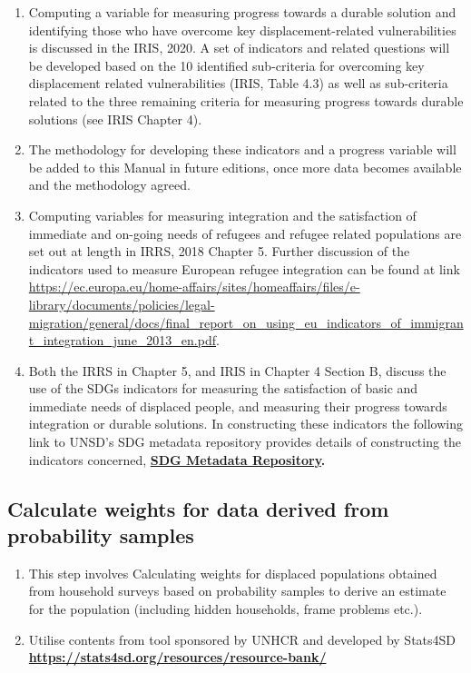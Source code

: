 \documentclass[
]{article}
\begin{document}
\begin{enumerate}
\def\labelenumi{\arabic{enumi}.}
\setcounter{enumi}{389}
\item
  Computing a variable for measuring progress towards a durable
  solution and identifying those who have overcome key
  displacement-related vulnerabilities is discussed in the IRIS, 2020.
  A set of indicators and related questions will be developed based on
  the 10 identified sub-criteria for overcoming key displacement
  related vulnerabilities (IRIS, Table 4.3) as well as sub-criteria
  related to the three remaining criteria for measuring progress
  towards durable solutions (see IRIS Chapter 4).
\item
  The methodology for developing these indicators and a progress
  variable will be added to this Manual in future editions, once more
  data becomes available and the methodology agreed.
\item
  Computing variables for measuring integration and the satisfaction
  of immediate and on-going needs of refugees and refugee related
  populations are set out at length in IRRS, 2018 Chapter 5. Further
  discussion of the indicators used to measure European refugee
  integration can be found at link
  \url{https://ec.europa.eu/home-affairs/sites/homeaffairs/files/e-library/documents/policies/legal-migration/general/docs/final_report_on_using_eu_indicators_of_immigrant_integration_june_2013_en.pdf}.
\item
  Both the IRRS in Chapter 5, and IRIS in Chapter 4 Section B,
  discuss the use of the SDGs indicators for measuring the
  satisfaction of basic and immediate needs of displaced people, and
  measuring their progress towards integration or durable solutions.
  In constructing these indicators the following link to UNSD's SDG
  metadata repository provides details of constructing the indicators
  concerned, \textbf{\href{https://unstats.un.org/sdgs/metadata/}{SDG Metadata
  Repository}.}
\end{enumerate}

\hypertarget{calculate-weights-for-data-derived-from-probability-samples}{%
\subsection{Calculate weights for data derived from probability samples}\label{calculate-weights-for-data-derived-from-probability-samples}}

\begin{enumerate}
\def\labelenumi{\arabic{enumi}.}
\setcounter{enumi}{393}
\item
  This step involves Calculating weights for displaced populations
  obtained from household surveys based on probability samples to
  derive an estimate for the population (including hidden households,
  frame problems etc.).
\item
  Utilise contents from tool sponsored by UNHCR and developed by
  Stats4SD
  \href{https://stats4sd.org/resources/resource-bank/}{\textbf{https://stats4sd.org/resources/resource-bank/}}
\end{enumerate}
\end{document}
